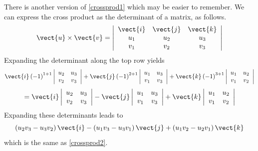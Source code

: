 There is another version of \ref{crossprod1} which may be easier to remember.
We can express the cross product as the determinant of a matrix, as follows. 
\begin{equation}
\vect{u}\times \vect{v} = \left\vert
\begin{array}{ccc}
\vect{i} & \vect{j} & \vect{k} \\
u_{1} & u_{2} & u_{3} \\
v_{1} & v_{2} & v_{3}
\end{array}
\right\vert  \label{crossprod3}
\end{equation}
Expanding the determinant along the top row yields
\begin{equation*}
\vect{i}\left( -1\right) ^{1+1}\left\vert
\begin{array}{cc}
u_{2} & u_{3} \\
v_{2} & v_{3}
\end{array}
\right\vert +\vect{j}\left( -1\right) ^{2+1}\left\vert
\begin{array}{cc}
u_{1} & u_{3} \\
v_{1} & v_{3}
\end{array}
\right\vert +\vect{k}\left( -1\right) ^{3+1}\left\vert
\begin{array}{cc}
u_{1} & u_{2} \\
v_{1} & v_{2}
\end{array}
\right\vert
\end{equation*}
\begin{equation*}
=\vect{i}\left\vert
\begin{array}{cc}
u_{2} & u_{3} \\
v_{2} & v_{3}
\end{array}
\right\vert -\vect{j}\left\vert
\begin{array}{cc}
u_{1} & u_{3} \\
v_{1} & v_{3}
\end{array}
\right\vert +\vect{k}\left\vert
\begin{array}{cc}
u_{1} & u_{2} \\
v_{1} & v_{2}
\end{array}
\right\vert
\end{equation*}
Expanding these determinants leads to 
\begin{equation*}
\left( u_{2}v_{3}-u_{3}v_{2}\right) \vect{i}-\left(
u_{1}v_{3}-u_{3}v_{1}\right) \vect{j}+\left( u_{1}v_{2}-u_{2}v_{1}\right)
\vect{k}  
\label{crossprod4}
\end{equation*}
which is the same as \ref{crossprod2}.

